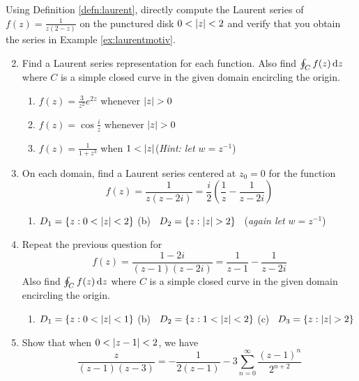 \goodbreak

\begin{exercises}
	\exstart Using Definition \ref{defn:laurent}, directly compute the Laurent series of $f(z)=\frac 1{z(2-z)}$ on the punctured disk $0<\left| z\right|<2$ and verify that you obtain the series in Example \ref{ex:laurentmotiv}. 

	\begin{enumerate}\setcounter{enumi}{1}
	  \item Find a Laurent series representation for each function. Also find $\oint_Cf(z)\,{\mathrm{d} z}$ where $C$ is a simple closed curve in the given domain encircling the origin.
	  \begin{enumerate}
	    \item $f(z)=\frac 3{z^2}e^{2z}$ whenever $\nm z>0$
	   
	    \item $f(z)=\cos\frac iz$ whenever $\nm z>0$
	    
	    \item $f(z)=\frac 1{1+z^3}$ when $1<\left| z\right|$\quad (\emph{Hint: let $w=z^{-1}$})
	  \end{enumerate}
	  
	  
	  \item On each domain, find a Laurent series centered at $z_0=0$ for the function
	  \[
	  	f(z)=\frac{1}{z(z-2i)}=\frac i2\left(\frac 1z-\frac 1{z-2i}\right)
	  \]
	  \begin{enumerate}
	    \item $D_1=\{z:0<\left| z\right|<2\}$
	    \qquad\qquad
	    (b) \ $D_2=\{z:\nm z>2\}$ \ (\emph{again let $w=z^{-1}$})
		\end{enumerate}
		
		
		\item Repeat the previous question for
	  \[
	  	f(z)=\frac{1-2i}{(z-1)(z-2i)}=\frac 1{z-1}-\frac 1{z-2i}
	  \]
	  Also find $\oint_Cf(z)\,{\mathrm{d} z}$ where $C$ is a simple closed curve in the given domain encircling the origin.
	  \begin{enumerate}
	    \item $D_1=\{z:0<\left| z\right|<1\}$
	    \qquad\quad%
	    (b) \ $D_2=\{z:1<\left| z\right|<2\}$
			\qquad\quad
			(c) \ $D_3=\{z:\nm z>2\}$
		\end{enumerate}
	
	
		\item Show that when $0<\left| z-1\right|<2$,  we have
		\[
			\frac z{(z-1)(z-3)}=-\frac 1{2(z-1)}-3\sum_{n=0}^\infty\frac{(z-1)^n}{2^{n+2}}
		\]
		

\end{enumerate}
\end{exercises}
